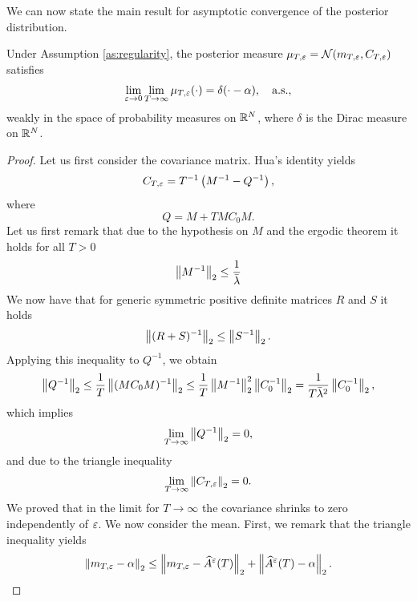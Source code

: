 \documentclass[10pt]{article}
\begin{document}
We can now state the main result for asymptotic convergence of the posterior distribution.
\begin{theorem}\label{thm:BayesianBias} Under Assumption \ref{as:regularity}, the posterior measure $\mu_{T,\varepsilon} = \mathcal N(m_{T,\varepsilon}, C_{T,\varepsilon})$ satisfies
	\begin{equation}
		\lim_{\varepsilon \to 0}\lim_{T \to \infty} \mu_{T,\varepsilon}(\cdot) = \delta(\cdot - \alpha), \quad \text{a.s.},
	\end{equation}
	weakly in the space of probability measures on $\mathbb{R}^N$, where $\delta$ is the Dirac measure on $\mathbb{R}^N$.
\end{theorem}
\begin{proof} Let us first consider the covariance matrix. Hua's identity yields
	\begin{equation}
	C_{T,\varepsilon} = T^{-1} \left(M^{-1} - Q^{-1}\right),
	\end{equation}
	where 
	\begin{equation}
	Q = M + T M C_0 M.
	\end{equation}
	Let us first remark that due to the hypothesis on $M$ and the ergodic theorem it holds for all $T > 0$
	\begin{equation}
		\left\|M^{-1}\right\|_2 \leq \frac1{\bar \lambda}
	\end{equation}
	We now have that for generic symmetric positive definite matrices $R$ and $S$ it holds
	\begin{equation}
		\left\|(R+S)^{-1}\right\|_2 \leq \left\|S^{-1}\right\|_2.
	\end{equation}
	Applying this inequality to $Q^{-1}$, we obtain
	\begin{equation}
		\left\|Q^{-1}\right\|_2 \leq \frac1T \left\|(MC_0M)^{-1}\right\|_2 \leq \frac1T \left\|M^{-1}\right\|_2^2 \left\|C_0^{-1}\right\|_2 = \frac1{T\bar \lambda^2} \left\|C_0^{-1}\right\|_2,
	\end{equation}
	which implies
	\begin{equation}
		\lim_{T \to \infty}\left\|Q^{-1}\right\|_2 = 0,
	\end{equation}
	and due to the triangle inequality
	\begin{equation}\label{eq:CovarianceShrink}
		\lim_{T \to \infty}\left\|C_{T,\varepsilon}\right\|_2 = 0.
	\end{equation}
	We proved that in the limit for $T \to \infty$ the covariance shrinks to zero independently of $\varepsilon$. We now consider the mean. First, we remark that the triangle inequality yields
	\begin{equation}
		\norm{m_{T,\epl} - \alpha}_2 \leq \norm{m_{T,\epl} - \widehat A^\epl(T)}_2 + \norm{\widehat A^\epl(T) - \alpha}_2.

\end{equation}
\end{proof}
\end{document}
